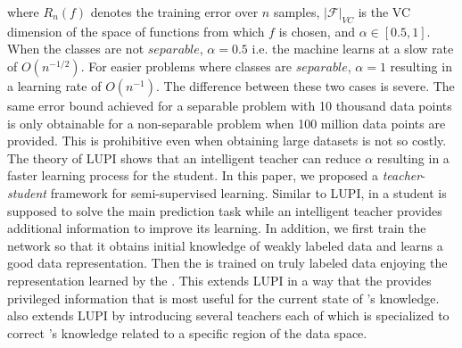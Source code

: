 where $R_n(f)$ denotes the training error over $n$ samples, $|\mathcal{F}|_{VC}$ is the VC dimension of the space of functions from which $f$ is chosen, and $\alpha \in [0.5,1]$. When the classes are not $separable$, $\alpha = 0.5$ i.e. the machine learns at a slow rate of $O(n^{-1/2})$. For easier problems where classes are $separable$, $\alpha=1$ resulting in a learning rate of $O(n^{-1})$.  The difference between these two cases is severe. The same error bound achieved for a separable problem with 10 thousand data points is only obtainable for a non-separable problem when 100 million data points are provided. This is prohibitive even when obtaining large datasets is not so costly. The theory of LUPI shows that an intelligent teacher can reduce $\alpha$ resulting in a faster learning process for the student. In this paper, we proposed a \emph{teacher}-\emph{student} framework for semi-supervised learning. Similar to LUPI, in \fwl a student is supposed to solve the main prediction task while an intelligent teacher provides additional information to improve its learning. In addition, we first train the \std network so that it obtains initial knowledge of weakly labeled data and learns a good data representation. Then the \tch is trained on truly labeled data enjoying the representation learned by the \std. This extends LUPI in a way that the \tch provides privileged information that is most useful for the current state of \std's knowledge. \fwl also extends LUPI by introducing several teachers each of which is specialized to correct \std's knowledge related to a specific region of the data space.


